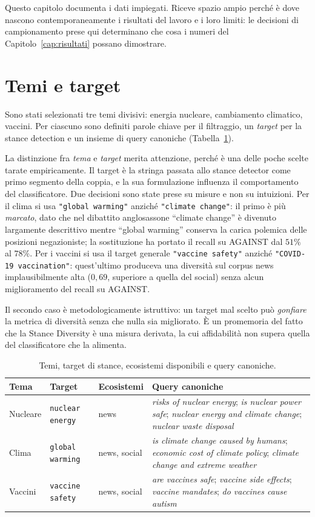 \documentclass[11pt,a4paper]{report}
\begin{document}
Questo capitolo documenta i dati impiegati. Riceve spazio ampio perché è dove nascono
contemporaneamente i risultati del lavoro e i loro limiti: le decisioni di campionamento prese
qui determinano che cosa i numeri del Capitolo~\ref{cap:risultati} possano dimostrare.

\section{Temi e target}\label{sec:target}
Sono stati selezionati tre temi divisivi: energia nucleare, cambiamento climatico, vaccini. Per
ciascuno sono definiti parole chiave per il filtraggio, un \emph{target} per la stance detection
e un insieme di query canoniche (Tabella~\ref{tab:temi}).

La distinzione fra \emph{tema} e \emph{target} merita attenzione, perché è una delle poche
scelte tarate empiricamente. Il target è la stringa passata allo stance detector come primo
segmento della coppia, e la sua formulazione influenza il comportamento del classificatore. Due
decisioni sono state prese su misure e non su intuizioni. Per il clima si usa
\texttt{"global warming"} anziché \texttt{"climate change"}: il primo è più \emph{marcato}, dato
che nel dibattito anglosassone ``climate change'' è divenuto largamente descrittivo mentre
``global warming'' conserva la carica polemica delle posizioni negazioniste; la sostituzione ha
portato il recall su AGAINST dal $51\%$ al $78\%$. Per i vaccini si usa il target generale
\texttt{"vaccine safety"} anziché \texttt{"COVID-19 vaccination"}: quest'ultimo produceva una
diversità sul corpus news implausibilmente alta ($0{,}69$, superiore a quella del social) senza
alcun miglioramento del recall su AGAINST.

Il secondo caso è metodologicamente istruttivo: un target mal scelto può \emph{gonfiare} la
metrica di diversità senza che nulla sia migliorato. È un promemoria del fatto che la Stance
Diversity è una misura derivata, la cui affidabilità non supera quella del classificatore che la
alimenta.

\begin{table}[t]
\centering
\small
\begin{tabularx}{\textwidth}{lllX}
\toprule
\textbf{Tema} & \textbf{Target} & \textbf{Ecosistemi} & \textbf{Query canoniche} \\
\midrule
Nucleare & \texttt{nuclear energy} & news &
\emph{risks of nuclear energy}; \emph{is nuclear power safe}; \emph{nuclear energy and climate
change}; \emph{nuclear waste disposal} \\
\addlinespace
Clima & \texttt{global warming} & news, social &
\emph{is climate change caused by humans}; \emph{economic cost of climate policy};
\emph{climate change and extreme weather} \\
\addlinespace
Vaccini & \texttt{vaccine safety} & news, social &
\emph{are vaccines safe}; \emph{vaccine side effects}; \emph{vaccine mandates};
\emph{do vaccines cause autism} \\
\bottomrule
\end{tabularx}
\caption{Temi, target di stance, ecosistemi disponibili e query canoniche.}
\label{tab:temi}
\end{table}
\end{document}
